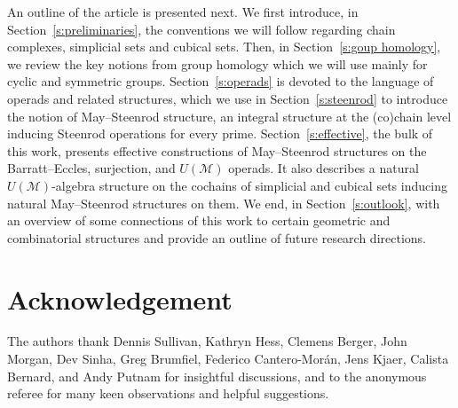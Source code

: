 An outline of the article is presented next.
We first introduce, in Section~\ref{s:preliminaries}, the conventions we will follow regarding chain complexes, simplicial sets and cubical sets.
Then, in Section~\ref{s:goup homology}, we review the key notions from group homology which we will use mainly for cyclic and symmetric groups.
Section~\ref{s:operads} is devoted to the language of operads and related structures, which we use in Section~\ref{s:steenrod} to introduce the notion of May--Steenrod structure, an integral structure at the (co)chain level inducing Steenrod operations for every prime.
Section~\ref{s:effective}, the bulk of this work, presents effective constructions of May--Steenrod structures on the Barratt--Eccles, surjection, and $U(\mathcal M)$ operads.
It also describes a natural $U(\mathcal M)$-algebra structure on the cochains of simplicial and cubical sets inducing natural May--Steenrod structures on them.
We end, in Section~\ref{s:outlook}, with an overview of some connections of this work to certain geometric and combinatorial structures and provide an outline of future research directions.

\section*{Acknowledgement}

The authors thank Dennis Sullivan, Kathryn Hess, Clemens Berger, John Morgan, Dev Sinha, Greg Brumfiel, Federico Cantero-Mor\'an, Jens Kjaer, Calista Bernard, and Andy Putnam for insightful discussions, and to the anonymous referee for many keen observations and helpful suggestions.